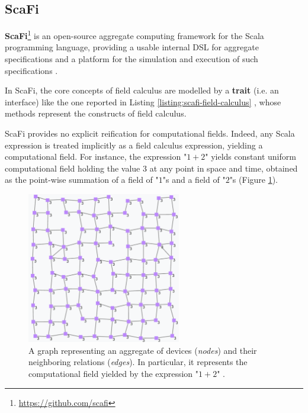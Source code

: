 \subsection{ScaFi}

\textbf{\ac{ScaFi}}\footnote{\url{https://github.com/scafi}} is an
open-source aggregate computing framework for the Scala programming language,
providing a usable internal \ac{DSL} for aggregate specifications and a
platform for the simulation and execution of such specifications
\cite{ScaFi-Documentation}.

In \ac{ScaFi}, the core concepts of field calculus are modelled by a
\textbf{trait} (i.e. an interface) like the one reported in Listing
\ref{listing:scafi-field-calculus} \cite{FieldCalculus-AggregateComputing},
whose methods represent the constructs of field calculus.



\ac{ScaFi} provides no explicit reification for computational fields. Indeed,
any Scala expression is treated implicitly as a field calculus expression,
yielding a computational field. For instance, the expression "$1+2$" yields
constant uniform computational field holding the value $3$ at any point in
space and time, obtained as the point-wise summation of a field of "$1$"s and a
field of "$2$"s (Figure \ref{figure:constant-uniform-field}).

\begin{figure}[h]
  \centering
  \includegraphics[width=0.60\textwidth]{resources/figures/constant-uniform-field.png}
  \caption{
    A graph representing an aggregate of devices (\textit{nodes}) and their
    neighboring relations (\textit{edges}). In particular, it represents the
    computational field yielded by the expression "$1+2$"
    \cite{ScaFi-Documentation}.
  }
  \label{figure:constant-uniform-field}
\end{figure}

